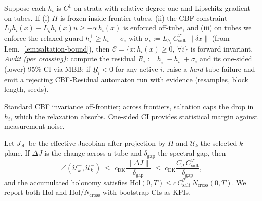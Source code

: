 \begin{lemma}\label{lem:cbf-frontier}
\emph{}
Suppose each $h_i$ is $C^1$ on strata with relative degree one and Lipschitz gradient on tubes.
If (i) $\Pi$ is frozen inside frontier tubes, (ii) the CBF constraint
$L_f h_i(x)+L_g h_i(x)u \ge -\alpha\,h_i(x)$ is enforced off-tube, and
(iii) on tubes we enforce the relaxed guard
$h_i^+\ge h_i^- - \sigma_i$ with $\sigma_i:=L_{h_i}\,C_{\mathrm{salt}}^\mathcal T\,\|\delta x\|$
(from Lem.~\ref{lem:saltation-bound}),
then $\mathcal C=\{x:h_i(x)\ge 0,\ \forall i\}$ is forward invariant.
\emph{Audit (per crossing):} compute the residual
\(
R_i:=h_i^+ - h_i^- + \sigma_i
\)
and its one-sided (lower) 95\% CI via MBB; if $\underline R_i<0$ for any active $i$, raise a \emph{hard} tube failure and emit a rejecting \textsf{CBF-Residual} automaton run with evidence (resamples, block length, seeds).
\begin{proofsketch}
Standard CBF invariance off-frontier; across frontiers, saltation caps the drop in $h_i$, which the relaxation absorbs. One-sided CI provides statistical margin against measurement noise.
\end{proofsketch}
\end{lemma}

\begin{proposition}\label{prop:holonomy}
\emph{}
Let $J_{\mathrm{eff}}$ be the effective Jacobian after projection by $\Pi$ and $\mathcal U_k$ the selected $k$-plane.
If $\Delta J$ is the change across a tube and $\delta_{\mathrm{gap}}$ the spectral gap, then
\[
\angle(\mathcal U_k^+,\mathcal U_k^-)
\;\le\; c_{\mathrm{DK}}\frac{\|\Delta J\|}{\delta_{\mathrm{gap}}}
\;\le\; c_{\mathrm{DK}}\frac{C_J\,C_{\mathrm{salt}}^\mathcal T}{\delta_{\mathrm{gap}}},
\]
and the accumulated holonomy satisfies
\(
\mathrm{Hol}(0,T)\le \bar c\, C_{\mathrm{salt}}^\mathcal T\,N_{\mathrm{cross}}(0,T).
\)
We report both $\mathrm{Hol}$ and $\mathrm{Hol}/N_{\mathrm{cross}}$ with bootstrap CIs as KPIs.
\end{proposition}

